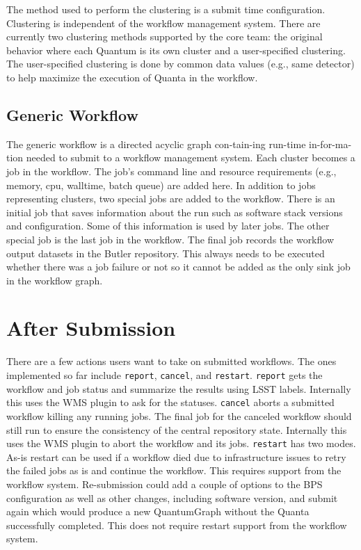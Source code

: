 \documentclass[11pt,twoside]{article}
\begin{document}
The method used to perform the clustering is a submit time configuration.
Clustering is independent of the workflow management system.  There
are currently two clustering methods supported by the core team: the
original behavior where each Quantum is its own cluster and a user-specified
clustering.  The user-specified clustering is done by common data values
(e.g., same detector) to help maximize the execution of Quanta in the
workflow.

\subsection{Generic Workflow} \label{generic_workflow}
The generic workflow is a directed acyclic graph con-tain-ing run-time
in-for-ma-tion needed to submit to a workflow management system.  Each
cluster becomes a job in the workflow.  The job's command line and
resource requirements (e.g., memory, cpu, walltime, batch queue) are
added here.  In addition to jobs representing clusters, two special jobs
are added to the workflow.  There is an initial job that saves information
about the run such as software stack versions and configuration.  Some
of this information is used by later jobs.  The other special job is the
last job in the workflow.  The final job records the workflow output
datasets in the Butler repository.  This always needs to be executed
whether there was a job failure or not so it cannot be added as the
only sink job in the workflow graph.

\section{After Submission}
There are a few actions users want to take on submitted workflows.  The
ones implemented so far include \texttt{report}, \texttt{cancel}, and \texttt{restart}.
\texttt{report} gets the workflow and job status and summarize
the results using LSST labels.  Internally this uses the WMS plugin to
ask for the statuses.
\texttt{cancel} aborts a submitted workflow killing any running
jobs.  The final job for the canceled workflow should still run to ensure
the consistency of the central repository state.  Internally this uses
the WMS plugin to abort the workflow and its jobs.
\texttt{restart} has two modes.
As-is restart can be used if a workflow died due to infrastructure
issues to retry the failed jobs as is and continue the workflow.
This requires support from the workflow system.
Re-submission could add a couple of options to the BPS configuration
as well as other changes, including software version, and submit again
which would produce a new QuantumGraph without the Quanta successfully
completed.  This does not require restart support from the workflow
system.
\end{document}
